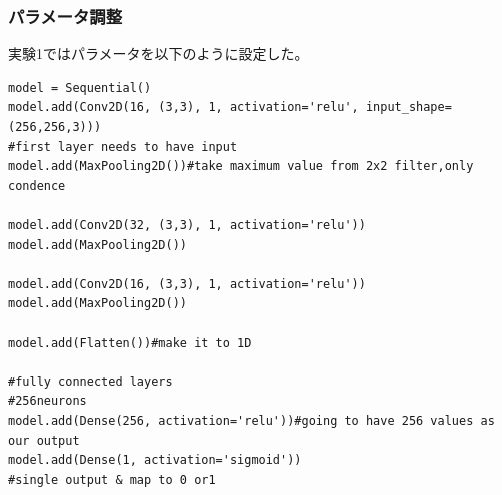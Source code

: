\documentclass[a4paper, 11pt, titlepage]{jsarticle}
\begin{document}
\subsubsection{パラメータ調整}
実験1ではパラメータを以下のように設定した。\par

\begin{lstlisting}[caption=パラメータ(実験1),label=fuga]
model = Sequential()
model.add(Conv2D(16, (3,3), 1, activation='relu', input_shape=(256,256,3))) 
#first layer needs to have input
model.add(MaxPooling2D())#take maximum value from 2x2 filter,only condence 

model.add(Conv2D(32, (3,3), 1, activation='relu'))
model.add(MaxPooling2D())

model.add(Conv2D(16, (3,3), 1, activation='relu'))
model.add(MaxPooling2D())

model.add(Flatten())#make it to 1D

#fully connected layers
#256neurons
model.add(Dense(256, activation='relu'))#going to have 256 values as our output
model.add(Dense(1, activation='sigmoid'))
#single output & map to 0 or1
\end{lstlisting}
\end{document}
